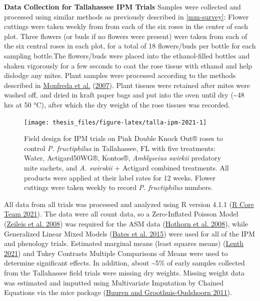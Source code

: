 \documentclass[12pt,final,CPage]{ufthesis}
\renewcommand{\hypertarget}[2]{\leavevmode\oldhypertarget{#1}{#2}}
\begin{document}
{  \textbf{Data Collection for Tallahassee IPM Trials}
  Samples were collected and processed using similar methods as previously described in \ref{mm-survey}: Flower cuttings were taken weekly from from each of the six roses in the center of each plot. Three flowers (or buds if no flowers were present) were taken from each of the six central roses in each plot, for a total of 18 flowers/buds per bottle for each sampling bottle.The flowers/buds were placed into the ethanol-filled bottles and shaken vigorously for a few seconds to coat the rose tissue with ethanol and help dislodge any mites. Plant samples were processed according to the methods described in \protect\hyperlink{ref-Monfreda2007}{Monfreda et al.} (\protect\hyperlink{ref-Monfreda2007}{2007}). Plant tissues were retained after mites were washed off, and dried in kraft paper bags and put into the oven until dry (\textasciitilde48 hrs at 50 °C), after which the dry weight of the rose tissues was recorded.
  \begin{figure}

  {\centering \texttt{[image: thesis\_files/figure-latex/talla-ipm-2021-1]} 

  }

  \caption[Field design for IPM trials on Pink Double Knock Out® roses to control \textit{P. fructiphilus} in Tallahassee, FL with five treatments]{Field design for IPM trials on Pink Double Knock Out® roses to control \textit{P. fructiphilus} in Tallahassee, FL with five treatments: Water, Actigard50WG®, Kontos®, \textit{Amblyseius swirkii} predatory mite sachets, and \textit{A. swirskii} + Actigard combined treatments. All products were applied at their label rates for 12 weeks. Flower cuttings were taken weekly to record \textit{P. fructiphilus} numbers.}\label{fig:talla-ipm-2021}
  \end{figure}
  \hypertarget{mm-field-analyze}{%
  \subsection{Analysis of field trial data}\label{mm-field-analyze}}

  All data from all trials was processed and analyzed using R version 4.1.1 (\protect\hyperlink{ref-RCT2021}{R Core Team 2021}). The data were all count data, so a Zero-Inflated Poisson Model (\protect\hyperlink{ref-Zeileis2008}{Zeileis et al. 2008}) was required for the ASM data (\protect\hyperlink{ref-Hothorn2008}{Hothorn et al. 2008}), while Generalized Linear Mixed Models (\protect\hyperlink{ref-Bates2015}{Bates et al. 2015}) were used for all of the IPM and phenology trials. Estimated marginal means (least squares means) (\protect\hyperlink{ref-Lenth2021}{Lenth 2021}) and Tukey Contrasts Multiple Comparisons of Means were used to determine significant effects. In addition, about \textasciitilde5\% of early samples collected from the Tallahassee field trials were missing dry weights. Missing weight data was estimated and imputted using Multivariate Imputation by Chained Equations via the mice package (\protect\hyperlink{ref-vanBuuren2011}{Buuren and Groothuis-Oudshoorn 2011}).

}
\end{document}
